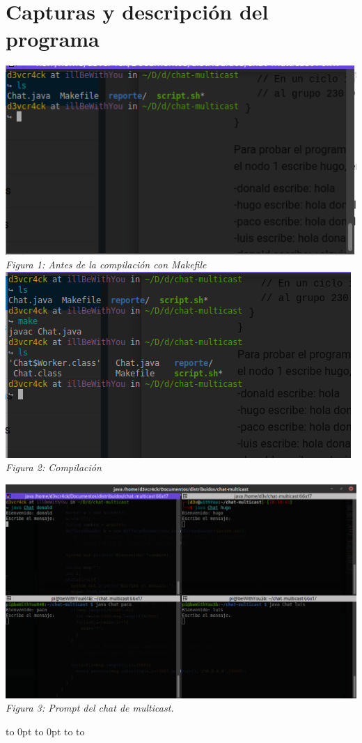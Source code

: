 \documentclass[10pt,executivepaper]{article}
\def\fillandplacepagenumber{%
 \par\pagestyle{empty}%
 \vbox to 0pt{\vss}\vfill
 \vbox to 0pt{\baselineskip0pt
   \hbox to\linewidth{\hss}%
   \baselineskip\footskip
   \hbox to\linewidth{%
     \hfil\thepage\hfil}\vss}}
\begin{document}
\section{Capturas y descripción del programa}
\begin{center}
  \includegraphics[scale=0.5]{img/antes.png}
  \\\textit{Figura 1: Antes de la compilación con Makefile}
  \\
  \includegraphics[scale=0.5]{img/compilacion.png}
  \\\textit{Figura 2: Compilación}
  \begin{landscape}
    \includegraphics[scale=0.5]{img/prompt.png}
    \\\textit{Figura 3: Prompt del chat de multicast.}
    \fillandplacepagenumber


\end{landscape}
\end{center}
\end{document}
